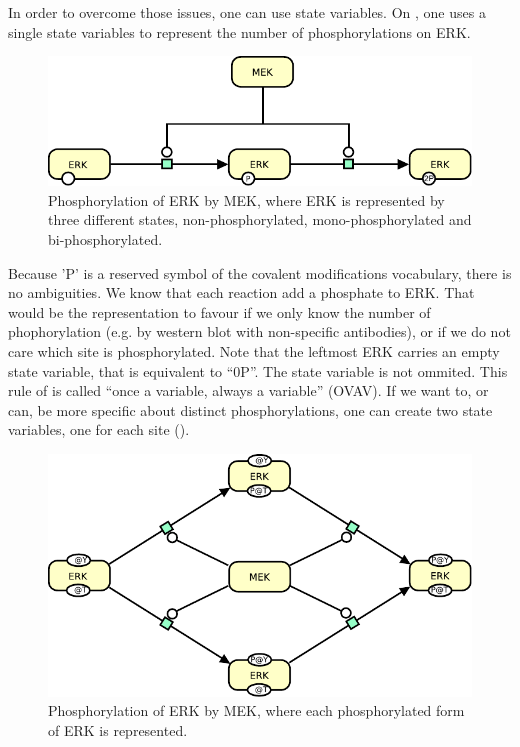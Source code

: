 In order to overcome those issues, one can use state variables. On , one uses a single state variables to represent the number of phosphorylations on ERK. 

\begin{figure}[H]
  \centering
  \includegraphics[scale = 1]{le_images/MAPK-OneVar}
  \caption{Phosphorylation of ERK by MEK, where ERK is represented by three different states, non-phosphorylated, mono-phosphorylated and bi-phosphorylated.}
  \label{fig:MAPK-OneVar}
\end{figure}

Because 'P' is a reserved symbol of the covalent modifications vocabulary, there is no ambiguities. We know that each reaction add a phosphate to ERK. That would be the representation to favour if we only know the number of phophorylation (e.g. by western blot with non-specific antibodies), or if we do not care which site is phosphorylated. Note that the leftmost ERK carries an empty state variable, that is equivalent to ``0P''. The state variable is not ommited. This rule of \SBGNPDLone is called ``once a variable, always a variable'' (OVAV).
If we want to, or can, be more specific about distinct phosphorylations, one can create two state variables, one for each site (). 

\begin{figure}[H]
  \centering
  \includegraphics[scale = 1]{le_images/MAPK-TwoVar}
  \caption{Phosphorylation of ERK by MEK, where each phosphorylated form of ERK is represented.}
  \label{fig:MAPK-TwoVar}
\end{figure}

